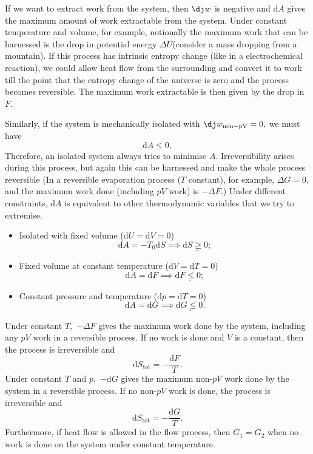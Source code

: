 \documentclass{article}
\theoremstyle{nonumberplain}
\begin{document}
If we want to extract work from the system, then $\mathrm{\dj}w $ is negative and $\mathrm{d} A$ gives the maximum amount of work extractable from the system. Under constant temperature and volume, for example, notionally the maximum work that can be harnessed is the drop in potential energy $\Delta U$(consider a mass dropping from a mountain). If this process has intrinsic entropy change (like in a electrochemical reaction), we could allow heat flow from the surrounding and convert it to work till the point that the entropy change of the universe is zero and the process becomes reversible. The maximum work extractable is then given by the drop in $F.$

Similarly, if the system is mechanically isolated with $\mathrm{\dj} w_{\mathrm{non-pV} } = 0, $ we must have
\[
    \mathrm{d}A \leq  0,
\]
Therefore, an isolated system always tries to minimise $A.$ Irreversibility arises during this process, but again this can be harnessed and make the whole process reversible (In a reversible evaporation process ($T$ constant), for example, $\Delta G = 0$, and the maximum work done (including $pV$ work) is $-\Delta F.$) Under different constraints, $\mathrm{d}A $ is equivalent to other thermodynamic variables that we try to extremise. 
\begin{itemize}
    \item Isolated with fixed volume ($\mathrm{d} U = \mathrm{d} V = 0$) \\
    \[
        \mathrm{d} A = -T_0 \mathrm{d} S \implies \underline{\mathrm{d} S \geq 0;} 
    \]
    \item Fixed volume at constant temperature ($\mathrm{d} V = \mathrm{d} T = 0$) \\
    \[
        \mathrm{d} A = \mathrm{d} F \implies \underline{\mathrm{d} F \leq  0;}
    \]
    \item Constant pressure and temperature ($\mathrm{d} p = \mathrm{d} T = 0$) \\ 
    \[
        \mathrm{d} A = \mathrm{d} G \implies  \underline{\mathrm{d} G \leq  0.}
    \]
\end{itemize} 

Under constant $T,$ $-\Delta F$ gives the maximum work done by the system, including any $pV$ work in a reversible process. If no work is done and $V$ is a constant, then the process is irreversible and 
\[
    \mathrm{d} S_{\mathrm{tot} } = -\frac{\mathrm{d} F}{T}.
\]
Under constant $T$ and $p,$ $-\mathrm{d} G$ gives the maximum non-$pV$ work done by the system in a reversible process. If no non-$pV$ work is done, the process is irreversible and 
\[
    \mathrm{d} S_{\mathrm{tot} } = -\frac{\mathrm{d} G}{T}.
\]
Furthermore, if heat flow is allowed in the flow process, then $G_1 = G_2$ when no work is done on the system under constant temperature. 
\end{document}
